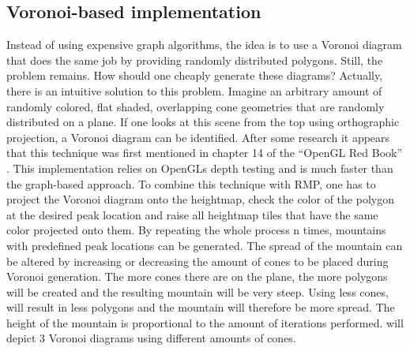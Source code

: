 \documentclass[11pt,a4paper,twoside,openright]{report}
\begin{document}
\subsection{Voronoi-based implementation}
\label{subsec:voronoibasedimpl}
Instead of using expensive graph algorithms, the idea is to use a Voronoi diagram that does the same job by providing randomly distributed polygons. Still, the problem remains. How should one cheaply generate these diagrams? Actually, there is an intuitive solution to this problem. Imagine an arbitrary amount of randomly colored, flat shaded, overlapping cone geometries that are randomly distributed on a plane. If one looks at this scene from the top using orthographic projection, a Voronoi diagram can be identified. After some research it appears that this technique was first mentioned in chapter 14 of the ``OpenGL Red Book'' \cite{Woo:1999:OPG:554539}. This implementation relies on OpenGLs depth testing and is much faster than the graph-based approach. To combine this technique with RMP, one has to project the Voronoi diagram onto the heightmap, check the color of the polygon at the desired peak location and raise all heightmap tiles that have the same color projected onto them. By repeating the whole process n times, mountains with predefined peak locations can be generated. The spread of the mountain can be altered by increasing or decreasing the amount of cones to be placed during Voronoi generation. The more cones there are on the plane, the more polygons will be created and the resulting mountain will be very steep. Using less cones, will result in less polygons and the mountain will therefore be more spread. The height of the mountain is proportional to the amount of iterations performed.  will depict 3 Voronoi diagrams using different amounts of cones.
\end{document}
